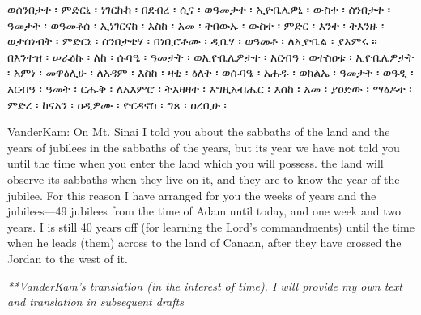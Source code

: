 
\begin{ethiopictext}
    ወሰንበታተ ፡ ምድርኒ ፡ ነገርኩከ ፡ በደብረ ፡ ሲና ፡ ወዓመታተ ፡
    ኢዮቤሌዎኒ ፡ ውስተ ፡ ሰንበታተ ፡ ዓመታት ፡ ወዓመቶሰ ፡ ኢነገርናከ ፡
    እስከ ፡ አመ ፡ ትበውኡ ፡ ውስተ ፡ ምድር ፡ እንተ ፡ ትእንዙ ፡
    ወታሰነብት ፡ ምድርኒ ፡ ሰንበታቲሃ ፡ በነቢሮቶሙ ፡ ዲቤሃ ፡ 
    ወዓመቶ ፡ ለኢዮቤል ፡ ያእምሩ ። 
    በእንተዝ ፡ ሠራዕኩ ፡ ለከ ፡ 
    ሱባዔ ፡ ዓመታት ፡ ወኢዮቤሌዎታተ ፡ አርብዓ ፡ ወተስዐቱ ፡ ኢዮቤሌዎታት ፡
    አምነ ፡ መዋዕሊሁ ፡ ለአዳም ፡ እስከ ፡ ዛቲ ፡ ዕለት ፡ ወሱባዔ ፡
    አሐዱ ፡ ወክልኤ ፡ ዓመታት ፡ ወዓዲ ፡ አርብዓ ፡ ዓመት ፡ 
    ርሑቅ ፡ ለአእምሮ ፡ ትእዛዛተ ፡ እግዚአብሔር ፡ እስከ ፡ አመ ፡ ያዐድው ፡
    ማዕዶተ ፡ ምድረ ፡ ከናአን ፡ ዐዲዎሙ ፡ ዮርዳኖስ ፡ ግጸ ፡ ዐረቢሁ ፡
\end{ethiopictext}
\begin{transliteration}



\end{transliteration}

\begin{translation}
    VanderKam: On Mt. Sinai I told you about the sabbaths of the land and the years of jubilees in the sabbaths of the years, but its year we have not told you until the time when you enter the land which you will possess.
    the land will observe its sabbaths when they live on it, and they are to know the year of the jubilee.
    For this reason I have arranged for you the weeks of years and the jubilees---49 jubilees from the time of Adam until today, and one week and two years. I is still 40 years off (for learning the Lord's commandments) until the time when he leads (them) across to the land of Canaan, after they have crossed the Jordan to the west of it.

    \emph{**VanderKam's translation (in the interest of time). I will provide my own text and translation in subsequent drafts}
\end{translation}